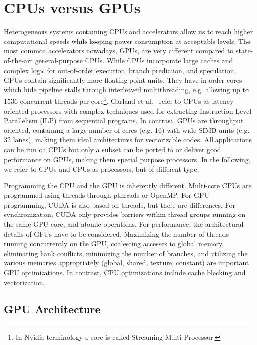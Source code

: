 \section{CPUs versus GPUs}
Heterogeneous systems containing CPUs and accelerators allow us to reach higher
computational speeds while keeping power consumption at acceptable levels. The
most common accelerators nowadays, GPUs, are very different compared to
state-of-the-art general-purpose CPUs. While CPUs incorporate large caches and
complex logic for out-of-order execution, branch prediction, and speculation,
GPUs contain significantly more floating point units. They have in-order cores
which hide pipeline stalls through interleaved multithreading, e.g. allowing up
to 1536 concurrent threads per core\footnote{In Nvidia terminology a core is
called Streaming Multi-Processor.}.
Garland et al.~\cite{garland2010} refer to CPUs as latency oriented processors
with complex techniques used for extracting Instruction Level Parallelism (ILP)
from sequential programs. In contrast, GPUs are throughput oriented, containing
a large number of cores (e.g. 16) with wide SIMD units (e.g. 32 lanes), making
them ideal architectures for vectorizable codes. All applications can be run on
CPUs but only a subset can be ported to or deliver good performance on GPUs,
making them special purpose processors. In the following, we refer to GPUs and
CPUs as processors, but of different type.

Programming the CPU and the GPU is inherently different. Multi-core CPUs are
programmed using threads through pthreads or OpenMP. For GPU programming, CUDA
is also based on threads, but there are differences. For synchronization, CUDA
only provides barriers within thread groups running on the same GPU core, and
atomic operations. For performance, the architectural details of GPUs have to be
considered. Maximizing the number of threads running concurrently on the GPU,
coalescing accesses to global memory, eliminating bank conflicts, minimizing the
number of branches, and utilizing the various memories appropriately (global,
shared, texture, constant) are important GPU optimizations.
In contrast, CPU optimizations include cache blocking and vectorization.

\subsection{GPU Architecture}

